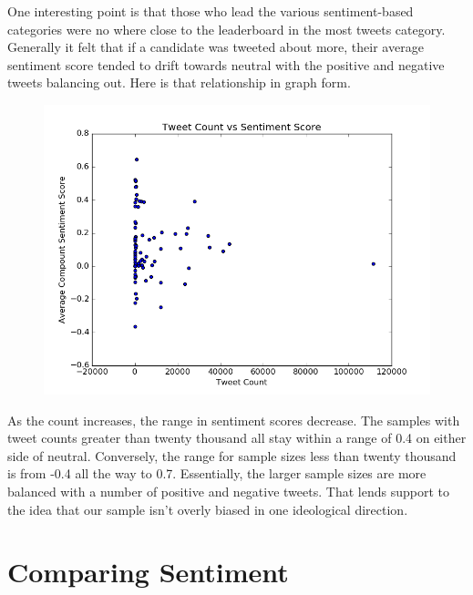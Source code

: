 \documentclass[11pt, twoside, reqno]{article}
\begin{document}
One interesting point is that those who lead the various sentiment-based categories were no where close to the leaderboard in the most tweets category. Generally it felt that if a candidate was tweeted about more, their average sentiment score tended to drift towards neutral with the positive and negative tweets balancing out. Here is that relationship in graph form. 
\begin{figure}[H]
\centering
	\includegraphics[scale=0.5]{count_sentiment}
\end{figure}



As the count increases, the range in sentiment scores decrease. The samples with tweet counts greater than twenty thousand all stay within a range of 0.4 on either side of neutral. Conversely, the range for sample sizes less than twenty thousand is from -0.4 all the way to 0.7. Essentially, the larger sample sizes are more balanced with a number of positive and negative tweets. That lends support to the idea that our sample isn't overly biased in one ideological direction. 
\section{Comparing Sentiment}
\end{document}
